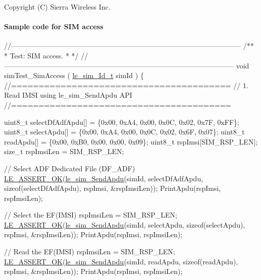 Copyright (C) Sierra Wireless Inc. \hypertarget{c_simTestApdu}{}\paragraph{Sample code for S\+IM access}\label{c_simTestApdu}

\begin{DoxyCodeInclude}
\textcolor{comment}{//--------------------------------------------------------------------------------------------------}\textcolor{comment}{}
\textcolor{comment}{/**}
\textcolor{comment}{ * Test: SIM access.}
\textcolor{comment}{ *}
\textcolor{comment}{ */}
\textcolor{comment}{//--------------------------------------------------------------------------------------------------}
\textcolor{keywordtype}{void} simTest\_SimAccess
(
    \hyperlink{le__sim__interface_8h_aace49df88426119626fb1ef4e544ccdd}{le\_sim\_Id\_t} simId
)
\{
    \textcolor{comment}{//========================================}
    \textcolor{comment}{// 1. Read IMSI using le\_sim\_SendApdu API}
    \textcolor{comment}{//========================================}

    uint8\_t selectDfAdfApdu[] = \{0x00, 0xA4, 0x00, 0x0C, 0x02, 0x7F, 0xFF\};
    uint8\_t selectApdu[] = \{0x00, 0xA4, 0x00, 0x0C, 0x02, 0x6F, 0x07\};
    uint8\_t readApdu[] = \{0x00, 0xB0, 0x00, 0x00, 0x09\};
    uint8\_t rspImsi[SIM\_RSP\_LEN];
    \textcolor{keywordtype}{size\_t} rspImsiLen = SIM\_RSP\_LEN;

    \textcolor{comment}{// Select ADF Dedicated File (DF\_ADF)}
    \hyperlink{le__log_8h_a7cd2daa3d4af1de4d29e0eed95187484}{LE\_ASSERT\_OK}(\hyperlink{le__sim__interface_8h_ad59f8ec574f4eab0cfae070a1e593298}{le\_sim\_SendApdu}(simId,
                                 selectDfAdfApdu,
                                 \textcolor{keyword}{sizeof}(selectDfAdfApdu),
                                 rspImsi,
                                 &rspImsiLen));
    PrintApdu(rspImsi, rspImsiLen);

    \textcolor{comment}{// Select the EF(IMSI)}
    rspImsiLen = SIM\_RSP\_LEN;
    \hyperlink{le__log_8h_a7cd2daa3d4af1de4d29e0eed95187484}{LE\_ASSERT\_OK}(\hyperlink{le__sim__interface_8h_ad59f8ec574f4eab0cfae070a1e593298}{le\_sim\_SendApdu}(simId,
                                 selectApdu,
                                 \textcolor{keyword}{sizeof}(selectApdu),
                                 rspImsi,
                                 &rspImsiLen));
    PrintApdu(rspImsi, rspImsiLen);

    \textcolor{comment}{// Read the EF(IMSI)}
    rspImsiLen = SIM\_RSP\_LEN;
    \hyperlink{le__log_8h_a7cd2daa3d4af1de4d29e0eed95187484}{LE\_ASSERT\_OK}(\hyperlink{le__sim__interface_8h_ad59f8ec574f4eab0cfae070a1e593298}{le\_sim\_SendApdu}(simId,
                                 readApdu,
                                 \textcolor{keyword}{sizeof}(readApdu),
                                 rspImsi,
                                 &rspImsiLen));
    PrintApdu(rspImsi, rspImsiLen);


\end{DoxyCodeInclude}
